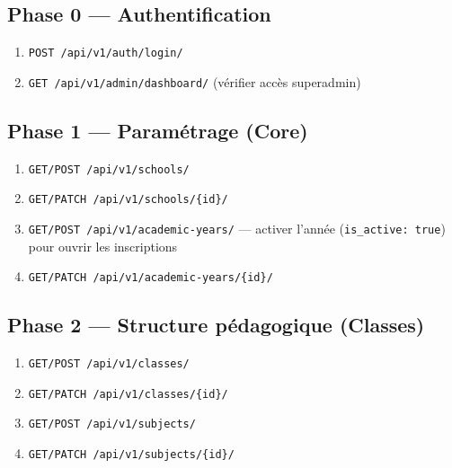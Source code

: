 \documentclass[11pt,a4paper]{article}
\begin{document}
\subsection{Phase 0 --- Authentification}
\begin{enumerate}[noitemsep]
    \item \texttt{POST /api/v1/auth/login/}
    \item \texttt{GET /api/v1/admin/dashboard/} (vérifier accès superadmin)
\end{enumerate}

\subsection{Phase 1 --- Paramétrage (Core)}
\begin{enumerate}[noitemsep]
    \item \texttt{GET/POST /api/v1/schools/}
    \item \texttt{GET/PATCH /api/v1/schools/\{id\}/}
    \item \texttt{GET/POST /api/v1/academic-years/} --- activer l'année (\texttt{is\_active: true}) pour ouvrir les inscriptions
    \item \texttt{GET/PATCH /api/v1/academic-years/\{id\}/}
\end{enumerate}

\subsection{Phase 2 --- Structure pédagogique (Classes)}
\begin{enumerate}[noitemsep]
    \item \texttt{GET/POST /api/v1/classes/}
    \item \texttt{GET/PATCH /api/v1/classes/\{id\}/}
    \item \texttt{GET/POST /api/v1/subjects/}
    \item \texttt{GET/PATCH /api/v1/subjects/\{id\}/}
\end{enumerate}
\end{document}
